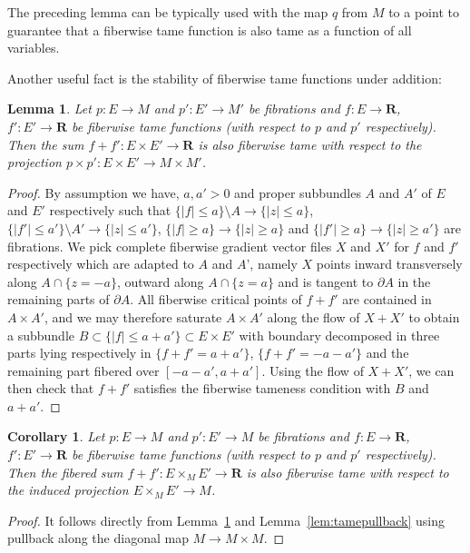 \documentclass[12pt,a4paper]{article}
\numberwithin{equation}{section}
\newtheorem{lem}[equation]{Lemma}
\newtheorem{cor}[equation]{Corollary}
\theoremstyle{definition}
\theoremstyle{remark}
\newcommand{\R}{\mathbf{R}}
\newcommand{\del}{\partial}
\begin{document}
The preceding lemma can be typically used with the map $q$ from $M$ to a point to guarantee that a fiberwise tame function is also tame as a function of all variables.

Another useful fact is the stability of fiberwise tame functions under addition:
\begin{lem}\label{lem:tamesum}
Let $p:E\to M$ and $p':E'\to M'$ be fibrations and $f:E\to \R$, $f':E'\to \R$ be fiberwise tame functions (with respect to $p$ and $p'$ respectively).
Then the sum $f+f':E\times E'\to \R$ is also fiberwise tame with respect to the projection $p\times p' : E\times E'\to M\times M'$.
\end{lem}

\begin{proof}
By assumption we have, $a, a'>0$ and proper subbundles $A$ and $A'$ of $E$ and $E'$ respectively
such that $\{|f|\leq a\}\setminus A\to \{|z|\leq a\}$,  $\{|f'|\leq a'\}\setminus A'\to \{|z|\leq a'\}$, $\{|f|\geq a\} \to \{|z|\geq a\}$ and $\{|f'|\geq a\} \to \{|z|\geq a'\}$ are fibrations.
We pick complete fiberwise gradient vector files $X$ and $X'$ for $f$ and $f'$ respectively which
are adapted to $A$ and $A$', namely $X$ points inward transversely along $A\cap\{z=-a\}$, outward along $A\cap\{z=a\}$ and is tangent to $\del A$ in the remaining parts of $\del A$.
All fiberwise critical points of $f+f'$ are contained in $A\times A'$, and we may therefore saturate $A\times A'$ along the flow of $X+ X'$ to obtain a subbundle $B\subset \{|f|\leq a+a'\}\subset E\times E'$
with boundary decomposed in three parts lying respectively in $\{f+f'=a+a'\}$, $\{f+f'=-a-a'\}$
and the remaining part fibered over $[-a-a',a+a']$. Using the flow of $X+X'$, we can then check that $f+f'$ satisfies the fiberwise tameness condition with $B$ and $a+a'$.
\end{proof}


\begin{cor}\label{cor:tamefiberedsum}
Let $p:E\to M$ and $p':E'\to M$ be fibrations and $f:E\to \R$, $f':E'\to \R$ be fiberwise tame functions (with respect to $p$ and $p'$ respectively).
Then the fibered sum $f+f':E\times_M E'\to \R$ is also fiberwise tame with respect to the induced projection $E\times_M E' \to M$.
\end{cor}
\begin{proof}
It follows directly from Lemma~\ref{lem:tamesum} and Lemma~\ref{lem:tamepullback} using pullback along the diagonal map $M\to M\times M$.
\end{proof}
\end{document}
